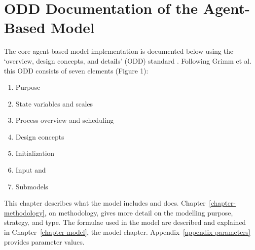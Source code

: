 \chapter{ODD Documentation of the Agent-Based Model} \label{appendix-odd}

The core agent-based model implementation is documented below using the `overview, design concepts, and details' (ODD) standard \cite{grimmODDProtocolReview2010a}. Following Grimm et al. \cite{grimmODDProtocolDescribing2020} this ODD consists of seven elements (Figure 1):

\begin{enumerate}
    \item Purpose
    \item State variables and scales
    \item Process overview and scheduling 
    \item Design concepts
    \item Initialization
    \item Input and 
    \item Submodels 
\end{enumerate}
This chapter describes what the model includes and does. Chapter~\ref{chapter-methodology}, on methodology, gives more detail on the modelling purpose, strategy, and type. The formulae used in the model are described and explained in Chapter~\ref{chapter-model}, the model chapter. Appendix~\ref{appendix-parameters} provides parameter values.  

